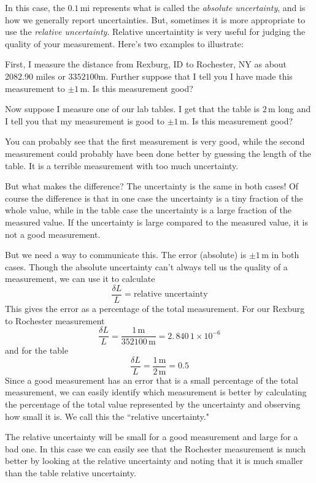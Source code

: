 \documentclass[twoside,11pt,ShortChapTitles]{BYUTextbook}
\begin{document}
In this case, the $0.1\, \text{mi}$ represents what is called the {\em absolute uncertainty}, and is how we generally report uncertainties.  But, sometimes it is more appropriate to use the {\em relative uncertainty}.  Relative uncertaintity is very useful for judging the quality of your measurement. Here's two examples to illustrate:

First, I measure the distance from Rexburg, ID to Rochester, NY as about
2082.90 miles or $3352100 \text{m}$. Further suppose that I tell you I have made this measurement to $\pm1\,\text{m}$. Is this measurement good?

Now suppose I measure one of our lab tables. I get that the table is  $2\,\text{m}$ long and I tell you that my measurement is good to $\pm1\,\text{m} . $ Is this measurement good?

You can probably see that the first measurement is very good, while the second
measurement could probably have been done better by guessing the length of the
table. It is a terrible measurement with too much uncertainty.

But what makes the difference? The uncertainty is the same in both cases! Of
course the difference is that in one case the uncertainty is a tiny fraction
of the whole value, while in the table case the uncertainty is a large
fraction of the measured value. If the uncertainty is large compared to the
measured value, it is not a good measurement.

But we need a way to communicate this. The error (absolute) is  $\pm1\,\text{m}$
in both cases. Though the
absolute uncertainty can't always tell us the quality of a measurement, we can
use it to calculate
\[
\frac{\delta L}{L}=\text{relative uncertainty}
\]
This gives the error as a percentage of the total measurement. For our Rexburg
to Rochester measurement
\[
\frac{\delta L}{L}=\frac{1\,\text{m} }{352100\,\text{m} }=\allowbreak2.\,\allowbreak840\,1\times10^{-6}
\]
and for the table
\[
\frac{\delta L}{L}=\frac{1\,\text{m} }{2\,\text{m} }=0.5
\]
Since a good measurement has an error that is a small percentage of the total
measurement, we can easily identify which measurement is better by calculating
the percentage of the total value represented by the uncertainty and observing
how small it is. We call this the ``relative
uncertainty."

The relative uncertainty will be small for a good measurement and large for
a bad one. In this case we can easily see that the Rochester measurement is
much better by looking at the relative uncertainty and noting that it is much
smaller than the table relative uncertainty.
\end{document}
